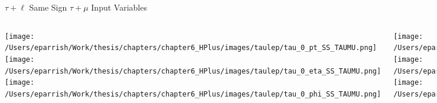 \documentclass[aspectratio=169,xcolor=table]{beamer}
\begin{document}
    \begin{frame}[t]{$\tau+\ell$ Same Sign $\tau+\mu$ Input Variables}
      \begin{columns}[t]
          \texttt{[image: /Users/eparrish/Work/thesis/chapters/chapter6\_HPlus/images/taulep/tau\_0\_pt\_SS\_TAUMU.png]}
          \texttt{[image: /Users/eparrish/Work/thesis/chapters/chapter6\_HPlus/images/taulep/tau\_0\_eta\_SS\_TAUMU.png]}
          \texttt{[image: /Users/eparrish/Work/thesis/chapters/chapter6\_HPlus/images/taulep/tau\_0\_phi\_SS\_TAUMU.png]}

          \texttt{[image: /Users/eparrish/Work/thesis/chapters/chapter6\_HPlus/images/taulep/met\_et\_SS\_TAUMU.png]}
          \texttt{[image: /Users/eparrish/Work/thesis/chapters/chapter6\_HPlus/images/taulep/met\_phi\_SS\_TAUMU.png]}
          \texttt{[image: /Users/eparrish/Work/thesis/chapters/chapter6\_HPlus/images/taulep/jet\_1\_pt\_SS\_TAUMU.png]}

          \texttt{[image: /Users/eparrish/Work/thesis/chapters/chapter6\_HPlus/images/taulep/bjet\_0\_pt\_SS\_TAUMU.png]}
          \texttt{[image: /Users/eparrish/Work/thesis/chapters/chapter6\_HPlus/images/taulep/bjet\_0\_eta\_SS\_TAUMU.png]}
          \texttt{[image: /Users/eparrish/Work/thesis/chapters/chapter6\_HPlus/images/taulep/bjet\_0\_phi\_SS\_TAUMU.png]}

          \texttt{[image: /Users/eparrish/Work/thesis/chapters/chapter6\_HPlus/images/taulep/tau\_0\_upsilon\_SS\_TAUMU.png]}
          \texttt{[image: /Users/eparrish/Work/thesis/chapters/chapter6\_HPlus/images/taulep/tau\_0\_charged\_tracks\_0\_pt\_SS\_TAUMU.png]}

      \end{columns}
    \end{frame}
\end{document}
